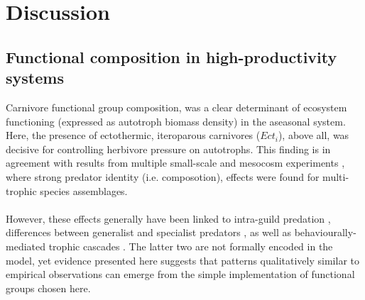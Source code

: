 \chapter{Discussion}
\label{chap:dis}
%
\section{Functional composition in high-productivity systems}
Carnivore functional group composition, was a clear determinant of ecosystem functioning (expressed as autotroph biomass density) in the aseasonal system. 
Here, the presence of ectothermic, iteroparous carnivores ($Ect_i$), above all, was decisive for controlling herbivore pressure on autotrophs. 
This finding is in agreement with results from multiple small-scale and mesocosm experiments \citep[e.g.][]{Finke2005, OConnor2008, Sanders2011}, where strong predator identity (i.e. composotion), effects were found for multi-trophic species assemblages.\\\\
However, these effects generally have been  linked to intra-guild predation \citep{Ives2005}, differences between  generalist and specialist predators \citep{Duffy2007, Sanders2011}, as well as behaviourally-mediated trophic cascades \citep{Beschta2009, Schmitz2015}. 
The latter two are not formally encoded in the model, yet evidence presented here suggests that patterns qualitatively similar to empirical observations can emerge from the simple implementation of functional groups chosen here. 
